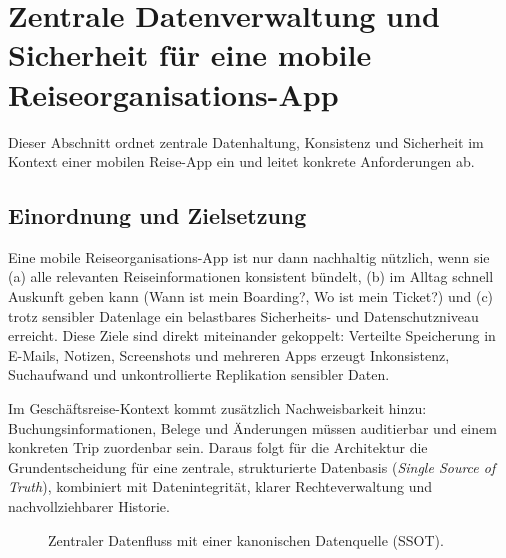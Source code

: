 \section{Zentrale Datenverwaltung und Sicherheit für eine mobile Reiseorganisations-App}

Dieser Abschnitt ordnet zentrale Datenhaltung, Konsistenz und Sicherheit im Kontext einer mobilen Reise-App ein und leitet konkrete Anforderungen ab.

\subsection{Einordnung und Zielsetzung}
Eine mobile Reiseorganisations-App ist nur dann nachhaltig nützlich, wenn sie
(a) alle relevanten Reiseinformationen konsistent bündelt, (b) im Alltag schnell
Auskunft geben kann (\glqq Wann ist mein Boarding?\grqq{}, \glqq Wo ist mein Ticket?\grqq{})
und (c) trotz sensibler Datenlage ein belastbares Sicherheits- und
Datenschutzniveau erreicht. Diese Ziele sind direkt miteinander gekoppelt:
Verteilte Speicherung in E-Mails, Notizen, Screenshots und mehreren Apps erzeugt
Inkonsistenz, Suchaufwand und unkontrollierte Replikation sensibler Daten.

Im Geschäftsreise-Kontext kommt zusätzlich Nachweisbarkeit hinzu:
Buchungsinformationen, Belege und Änderungen müssen auditierbar und einem
konkreten Trip zuordenbar sein. Daraus folgt für die Architektur die
Grundentscheidung für eine zentrale, strukturierte Datenbasis (\textit{Single
Source of Truth}), kombiniert mit Datenintegrität, klarer Rechteverwaltung und
nachvollziehbarer Historie.

\begin{figure}[H]
  \centering
  \caption{Zentraler Datenfluss mit einer kanonischen Datenquelle (SSOT).}
  \label{fig:ssot_dataflow}
\end{figure}

